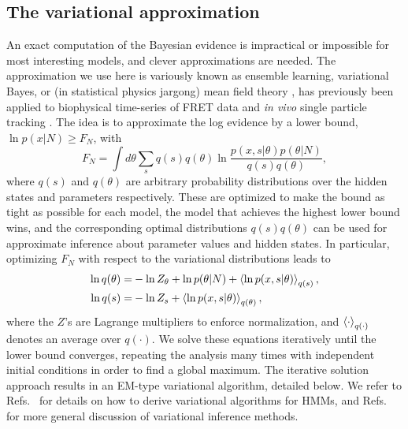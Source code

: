 \subsection{The variational approximation}
An exact computation of the Bayesian evidence is impractical or
impossible for most interesting models, and clever approximations are
needed. The approximation we use here is variously known as ensemble
learning, variational Bayes, or (in statistical physics jargong) mean
field theory \cite{mackay2003,bishop2006}, has previously been applied
to biophysical time-series of FRET data
\cite{bronson2009,vandemeent_manuscript,okamoto2012} and \textit{in
  vivo} single particle tracking \cite{persson2013}.  The idea is to
approximate the log evidence by a lower bound, $\ln p(x|N)\geq F_N$,
with
\begin{equation}
  F_N= \int d\theta\sum_{s} q(s)q(\theta)
  \ln\frac{p(x,s|\theta)p(\theta|N)}{q(s)q(\theta)},
\end{equation}
where $q(s)$ and $q(\theta)$ are arbitrary probability distributions
over the hidden states and parameters respectively.  These are
optimized to make the bound as tight as possible for each model, the
model that achieves the highest lower bound wins, and the
corresponding optimal distributions $q(s)q(\theta)$ can be used for
approximate inference about parameter values and hidden states. In
particular, optimizing $F_N$ with respect to the variational
distributions leads to
\begin{align}
  \ln q(\theta)=&-\ln Z_\theta+ \ln p(\theta|N)
  +\left\langle \ln p(x,s|\theta)\right\rangle_{q(s)},\label{seq:qparam}\\
  \ln q(s)=&-\ln Z_s+\left\langle \ln p(x,s|\theta)\right\rangle_{q(\theta)},\label{seq:sparam}
\end{align}
where the $Z$'s are Lagrange multipliers to enforce normalization, and
$\left\langle \cdot\right\rangle_{q(\cdot)}$ denotes an average over $q(\cdot)$. We solve
these equations iteratively until the lower bound converges, repeating
the analysis many times with independent initial conditions in order
to find a global maximum.  The iterative solution approach results in
an EM-type variational algorithm, detailed below.  We refer to
Refs.~\cite{mackay1997,beal2003,persson2013} for details on how to
derive variational algorithms for HMMs, and
Refs.~\cite{beal2003,mackay2003,bishop2006} for more general
discussion of variational inference methods.


